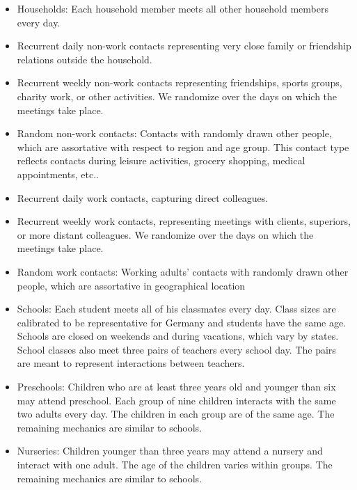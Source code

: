 \begin{itemize}
    \item Households: Each household member meets all other household members every day.
    
    \item Recurrent daily non-work contacts representing very close family or friendship
    relations outside the household.
    
    \item Recurrent weekly non-work contacts representing friendships, sports groups,
    charity work, or other activities. We randomize over the days on which the meetings take place.
    
    \item Random non-work contacts: Contacts with randomly drawn other
    people, which are assortative with respect to region and age group. This contact type
    reflects contacts during leisure activities, grocery shopping, medical appointments,
    etc..

    \item Recurrent daily work contacts, capturing direct colleagues.
    
    \item Recurrent weekly work contacts, representing meetings with clients, superiors, or more distant colleagues.
    We randomize over the days on which the meetings take place. 

    \item Random work contacts: Working adults' contacts with randomly drawn other
    people, which are assortative in geographical location

    \item Schools: Each student meets all of his classmates every day. Class sizes are
    calibrated to be representative for Germany and students have the same age. Schools
    are closed on weekends and during vacations, which vary by states. School classes
    also meet three pairs of teachers every school day. The pairs are meant to represent
    interactions between teachers.

    \item Preschools: Children who are at least three years old and younger than six may
    attend preschool. Each group of nine children interacts with the same two adults
    every day. The children in each group are of the same age. The remaining mechanics
    are similar to schools.

    \item Nurseries: Children younger than three years may attend a nursery and interact
    with one adult. The age of the children varies within groups. The remaining
    mechanics are similar to schools.
\end{itemize}

